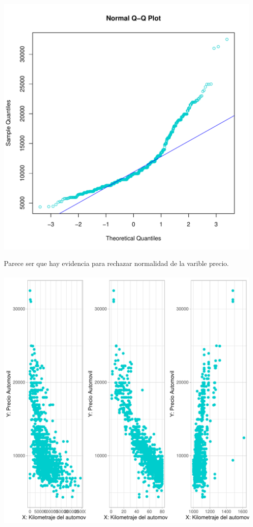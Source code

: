 \documentclass[11pt,letterpaper]{article}\usepackage[]{graphicx}\usepackage[]{color}
\makeatletter
\def\maxwidth{ %
  \ifdim\Gin@nat@width>\linewidth
    \linewidth
  \else
    \Gin@nat@width
  \fi
}
\newenvironment{knitrout}{}{} %
\makeatother
\begin{document}
\begin{enumerate}
\begin{knitrout}
\includegraphics[width=\maxwidth]{figure/unnamed-chunk-3-2} 

\end{knitrout}
Parece ser que hay evidencia para rechazar normalidad de la varible precio. 
\\\\
\begin{knitrout}
\color{fgcolor}
\includegraphics[width=\maxwidth]{figure/unnamed-chunk-4-1} 


\end{knitrout}
\end{enumerate}
\end{document}
